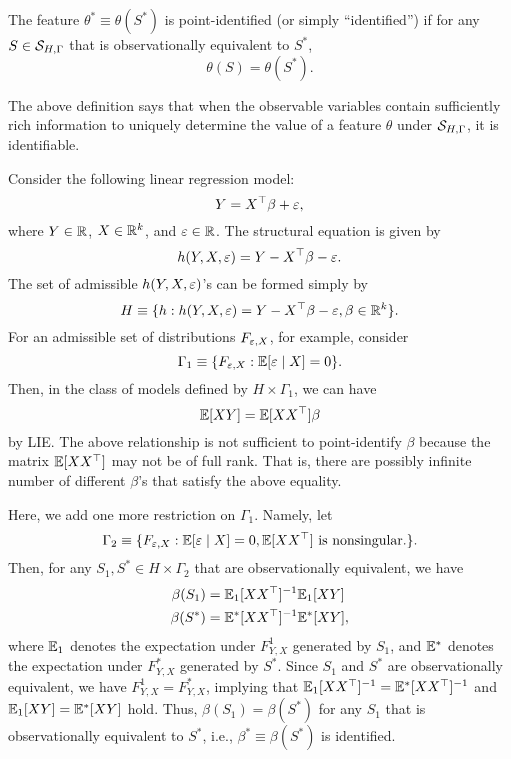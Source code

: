 \documentclass[11pt, A4paper, openany, uplatex]{book}
\begin{document}
\begin{definition} \label{def:identification}
	The feature $\theta^* \equiv \theta(S^*)$ is point-identified (or simply ``identified'') if for any $S \in \mathcal{S}_{H,\Gamma}$ that is observationally equivalent to $S^*$,
	\[
	\theta(S) = \theta(S^*).
	\]
\end{definition}
The above definition says that when the observable variables contain sufficiently rich information to uniquely determine the value of a feature $\theta$ under $\mathcal{S}_{H,\Gamma}$, it is identifiable.

\begin{example}\upshape
	Consider the following linear regression model:
	\[
		Y = X^\top \beta + \varepsilon,
	\]
	where $Y \in \mathbb{R}$, $X \in \mathbb{R}^k$, and $\varepsilon \in \mathbb{R}$.
	The structural equation is given by
	\[
	 	h(Y, X, \varepsilon) = Y - X^\top \beta - \varepsilon.
	\]
	The set of admissible $h(Y, X, \varepsilon)$'s can be formed simply by 
	\[
		H \equiv \{h : h(Y, X, \varepsilon) = Y -X^\top \beta-\varepsilon,  \beta \in \mathbb{R}^k\}.	
	\]
	For an admissible set of distributions $F_{\varepsilon,X}$, for example, consider 
	\[
		\Gamma_1 \equiv \{F_{\varepsilon,X} : \mathbb{E}[\varepsilon \mid X] = 0\}.
	\]
	Then, in the class of models defined by $H \times \Gamma_1$, we can have
	\[
	\mathbb{E} [XY ] = \mathbb{E}[XX^\top] \beta
	\]
	by LIE.
	The above relationship is not sufficient to point-identify $\beta$ because the matrix $\mathbb{E} [XX^\top]$ may not be of full rank.
	That is, there are possibly infinite number of different  $\beta$'s that satisfy the above equality.

	Here, we add one more restriction on $\Gamma_1$.
	Namely, let 
	\[
		\Gamma_2 \equiv \{F_{\varepsilon,X} : \mathbb{E}[\varepsilon \mid X] = 0, \mathbb{E}[XX^\top] \text{ is nonsingular.} \}.
	\]
	Then, for any $S_1, S^* \in H \times \Gamma_2$ that are observationally equivalent, we have
	\begin{align*}
	\beta(S_1) & = \mathbb{E}_1[XX^\top]^{-1} \mathbb{E}_1[XY ] \\
	\beta(S^*) & = \mathbb{E}^*[XX^\top]^{-1} \mathbb{E}^*[XY ],
	\end{align*}
	where $\mathbb{E}_1$ denotes the expectation under $F^1_{Y,X}$ generated by $S_1$, and $\mathbb{E}^*$ denotes the expectation under $F^*_{Y,X}$ generated by $S^*$.
	Since $S_1$ and $S^*$ are observationally equivalent, we have $F^1_{Y,X} = F^*_{Y,X}$, implying that $\mathbb{E}_1[XX^\top]^{-1} = \mathbb{E}^*[XX^\top]^{-1}$ and $\mathbb{E}_1[XY ] = \mathbb{E}^*[XY ]$ hold.
	Thus,  $\beta(S_1) =  \beta(S^*)$ for any $S_1$ that is observationally equivalent to $S^*$, i.e.,  $\beta^* \equiv \beta(S^*)$ is identified.
\end{example}
\end{document}
